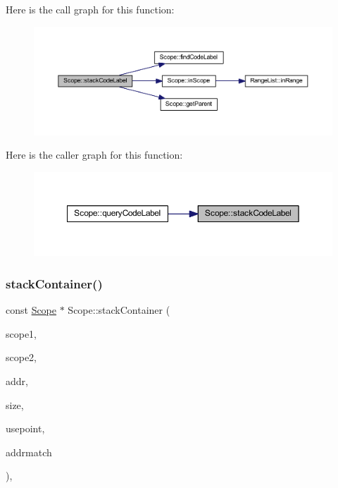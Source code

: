 Here is the call graph for this function\+:
\nopagebreak
\begin{figure}[H]
\begin{center}
\leavevmode
\includegraphics[width=350pt]{class_scope_a26992d3bf69e5c2c02e57943b1355f0d_cgraph}
\end{center}
\end{figure}
Here is the caller graph for this function\+:
\nopagebreak
\begin{figure}[H]
\begin{center}
\leavevmode
\includegraphics[width=350pt]{class_scope_a26992d3bf69e5c2c02e57943b1355f0d_icgraph}
\end{center}
\end{figure}
\mbox{\label{class_scope_a63e00dad81427a8595cf7bf13d8e1e0d}} 
\subsubsection{\texorpdfstring{stackContainer()}{stackContainer()}}
{\footnotesize\ttfamily const \mbox{\hyperlink{class_scope}{Scope}} $\ast$ Scope\+::stack\+Container (\begin{DoxyParamCaption}\item[{const \mbox{\hyperlink{class_scope}{Scope}} $\ast$}]{scope1,  }\item[{const \mbox{\hyperlink{class_scope}{Scope}} $\ast$}]{scope2,  }\item[{const \mbox{\hyperlink{class_address}{Address}} \&}]{addr,  }\item[{int4}]{size,  }\item[{const \mbox{\hyperlink{class_address}{Address}} \&}]{usepoint,  }\item[{\mbox{\hyperlink{class_symbol_entry}{Symbol\+Entry}} $\ast$$\ast$}]{addrmatch }\end{DoxyParamCaption})\hspace{0.3cm}{\ttfamily [static]}, {\ttfamily [protected]}}

